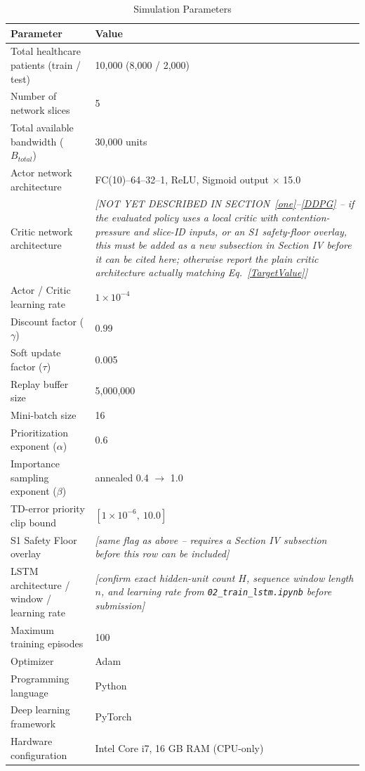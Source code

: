 \documentclass[10pt,journal,compsoc]{IEEEtran}
\begin{document}
\begin{table}[!t]
\centering
\caption{Simulation Parameters}
\label{simulation_parameters}
\begin{tabular}{|p{5.2cm}|p{2.8cm}|}
\hline
\textbf{Parameter} & \textbf{Value} \\
\hline
Total healthcare patients (train / test) & 10,000 (8,000 / 2,000) \\
\hline
Number of network slices & 5 \\
\hline
Total available bandwidth ($B_{total}$) & 30,000 units \\
\hline
Actor network architecture & FC(10)--64--32--1, ReLU, Sigmoid output $\times$ 15.0 \\
\hline
Critic network architecture & \textit{[NOT YET DESCRIBED IN SECTION~\ref{one}--\ref{DDPG} -- if the evaluated policy uses a local critic with contention-pressure and slice-ID inputs, or an S1 safety-floor overlay, this must be added as a new subsection in Section IV before it can be cited here; otherwise report the plain critic architecture actually matching Eq.~\eqref{TargetValue}]} \\
\hline
Actor / Critic learning rate & $1\times 10^{-4}$ \\
\hline
Discount factor ($\gamma$) & 0.99 \\
\hline
Soft update factor ($\tau$) & 0.005 \\
\hline
Replay buffer size & 5,000,000 \\
\hline
Mini-batch size & 16 \\
\hline
Prioritization exponent ($\alpha$) & 0.6 \\
\hline
Importance sampling exponent ($\beta$) & annealed 0.4 $\to$ 1.0 \\
\hline
TD-error priority clip bound & $[1\times 10^{-6},\ 10.0]$ \\
\hline
S1 Safety Floor overlay & \textit{[same flag as above -- requires a Section IV subsection before this row can be included]} \\
\hline
LSTM architecture / window / learning rate & \textit{[confirm exact hidden-unit count $H$, sequence window length $n$, and learning rate from \texttt{02\_train\_lstm.ipynb} before submission]} \\
\hline
Maximum training episodes & 100 \\
\hline
Optimizer & Adam \\
\hline
Programming language & Python \\
\hline
Deep learning framework & PyTorch \\
\hline
Hardware configuration & Intel Core i7, 16 GB RAM (CPU-only) \\
\hline
\end{tabular}
\end{table}
\end{document}
